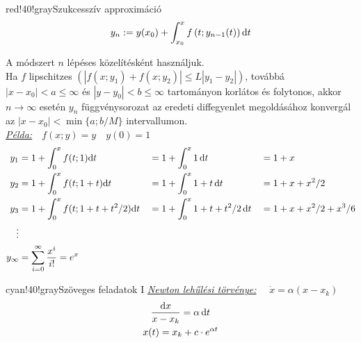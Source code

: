 \documentclass[main.tex]{subfiles}
\begin{document}
\begin{cbox}{red!40!gray}{Szukcesszív approximáció}
  \[
    y_n := y(x_0) + \int_{x_0}^x f \left(
    t; y_{n-1}(t)
    \right) \mathrm{d} t
  \]

  A módszert $n$ lépéses közelítésként használjuk.
  \\[2mm]
  Ha $f$ lipschitzes $\left(|f(x; y_1) + f(x; y_2)| \leq
    L |y_1 - y_2|\right)$, továbbá $|x-x_0|<a\leq\infty$
  és $|y-y_0|<b\leq\infty$ tartományon korlátos és
  folytonos, akkor $n \rightarrow \infty$ esetén $y_n$
  függvénysorozat az eredeti diffegyenlet megoldásához
  konvergál az $|x - x_0| < \min \{a; b/M\}$ intervallumon.
  \\[2mm]
  \emph{\underline{Példa:}}$\quad f(x; y) = y \quad y(0) = 1$
  \begin{alignat*}{3}
    y_1
     & = 1 + \int_0^x f(t; 1) \mathrm{d} t
     &                                                & = 1 + \int_0^x 1 \, \mathrm{d} t
     &                                                & = 1 + x
    \\
    y_2
     & = 1 + \int_0^x f(t; 1+t) \mathrm{d} t
     &                                                & = 1 + \int_0^x 1+t \, \mathrm{d} t
     &                                                & = 1 + x + x^2/2
    \\
    y_3
     & = 1 + \int_0^x f(t; 1+t+t^2/2) \mathrm{d} t
     &                                                & = 1 + \int_0^x 1+t+t^2/2 \, \mathrm{d} t
     &                                                & = 1 + x + x^2/2 + x^3/6
    \\
    \vdots
     &
    \\
    y_\infty
     & = \sum_{i=0}^\infty \frac{x^i}{i!} = e^x
  \end{alignat*}
\end{cbox}

\begin{cbox}{cyan!40!gray}{Szöveges feladatok I}
  \emph{\underline{Newton lehűlési törvénye:}}
  $\quad \dot{x} = \alpha(x - x_k)$
  \begin{gather*}
    \frac{\mathrm{d} x}{x - x_k} = \alpha \, \mathrm{d} t
    \\
    x(t) = x_k + c \cdot e^{\alpha t}
  \end{gather*}

\end{cbox}
\end{document}
